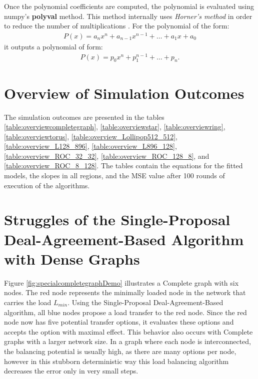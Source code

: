 Once the polynomial coefficients are computed, the polynomial is evaluated using numpy's \textbf{polyval} method. This method internally uses \textit{Horner's method} in order to reduce the number of multiplications \cite{NumPyPolyVal}. For the polynomial of the form:
\begin{align}
    P(x) = a_{n}x^{n}+a_{n-1}x^{n-1}+ \dots + a_{1}x+a_{0}
\end{align}
it outputs a polynomial of form:
\begin{align}
    P(x)=p_{0}x^{n}+p_{1}^{n-1}+\dots + p_{n}.
\end{align}
\cite{wolfram_horner}

\section{Overview of Simulation Outcomes}\label{sec:overviewSimOutcomes}
The simulation outcomes are presented in the tables \ref{table:overviewcompletegraph}, \ref{table:overviewstar}, \ref{table:overviewring}, \ref{table:overviewtorus}, \ref{table:overview_Lollipop512_512}, \ref{table:overview_L128_896}, \ref{table:overview_L896_128}, \ref{table:overview_ROC_32_32}, \ref{table:overview_ROC_128_8}, and \ref{table:overview_ROC_8_128}. The tables contain the equations for the fitted models, the slopes in all regions, and the MSE value after 100 rounds of execution of the algorithms.













\section{Struggles of the Single-Proposal Deal-Agreement-Based Algorithm with Dense Graphs}\label{sec:struggleDAB}
Figure \ref{fig:specialcompletegraphDemo} illustrates a Complete graph with six nodes. The red node represents the minimally loaded node in the network that carries the load $L_{min}$. Using the Single-Proposal Deal-Agreement-Based algorithm, all blue nodes propose a load transfer to the red node. Since the red node now has five potential transfer options, it evaluates these options and accepts the option with maximal effect. This behavior also occurs with Complete graphs with a larger network size. In a graph where each node is interconnected, the balancing potential is usually high, as there are many options per node, however in this stubborn deterministic way this load balancing algorithm decreases the error only in very small steps.

